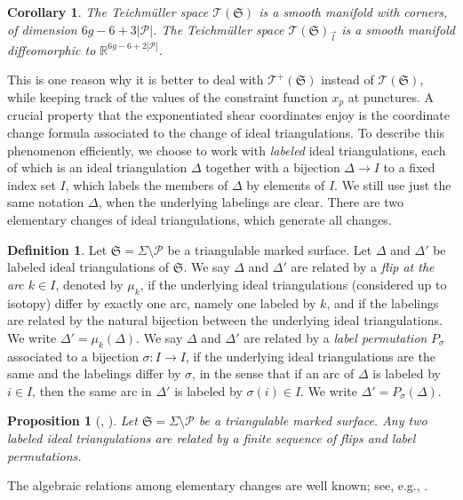 \documentclass[pdftex]{sigma}
\numberwithin{equation}{section}
\newtheorem{Corollary}[Theorem]{Corollary}
\newtheorem{Proposition}[Theorem]{Proposition}
\theoremstyle{definition}
\newtheorem{Definition}[Theorem]{Definition}
\begin{document}
\begin{Corollary}\label{cor:with_corners}
The Teichm\"uller space $\mathscr{T}(\mathfrak{S})$ is a smooth manifold with corners, of dimension $6g-6+3|\mathcal{P}|$.
The Teichm\"uller space $\mathscr{T}(\mathfrak{S})_{\vec{l}}$ is a smooth manifold diffeomorphic to $\mathbb{R}^{6g-6+2|\mathcal{P}|}$.
\end{Corollary}
This is one reason why it is better to deal with $\mathscr{T}^+(\mathfrak{S})$ instead of $\mathscr{T}(\mathfrak{S})$, while keeping track of the values of the constraint function $x_p$ at punctures.
A crucial property that the exponentiated shear coordinates enjoy is the coordinate change formula associated to the change of ideal triangulations. To describe this phenomenon efficiently, we choose to work with {\em labeled} ideal triangulations, each of which is an ideal triangulation $\Delta$ together with a bijection $\Delta \to I$ to a fixed index set $I$, which labels the members of $\Delta$ by elements of $I$. We still use just the same notation $\Delta$, when the underlying labelings are clear. There are two elementary changes of ideal triangulations, which generate all changes.
\begin{Definition}
Let $\mathfrak{S}= \Sigma\setminus \mathcal{P}$ be a triangulable marked surface. Let $\Delta$ and $\Delta'$ be labeled ideal triangulations of $\mathfrak{S}$.
We say $\Delta$ and $\Delta'$ are related by a {\em flip at the arc $k \in I$}, denoted by $\mu_k$, if the underlying ideal triangulations (considered up to isotopy) differ by exactly one arc, namely one labeled by $k$, and if the labelings are related by the natural bijection between the underlying ideal triangulations. We write $\Delta' = \mu_k(\Delta)$.
We say $\Delta$ and $\Delta'$ are related by a {\em label permutation} $P_\sigma$ associated to a bijection $\sigma \colon I \to I$, if the underlying ideal triangulations are the same and the labelings differ by $\sigma$, in the sense that if an arc of $\Delta$ is labeled by $i\in I$, then the same arc in $\Delta'$ is labeled by $\sigma(i)\in I$. We write $\Delta' = P_\sigma(\Delta)$.
\end{Definition}
\begin{Proposition}[{\cite[Fact 1.24]{P12}}, \cite{Thurston79}]
Let $\mathfrak{S} = \Sigma\setminus \mathcal{P}$ be a triangulable marked surface. Any two labeled ideal triangulations are related by a finite sequence of flips and label permutations.
\end{Proposition}
The algebraic relations among elementary changes are well known; see, e.g., \cite{FST, Kim_ratio}.
\end{document}
